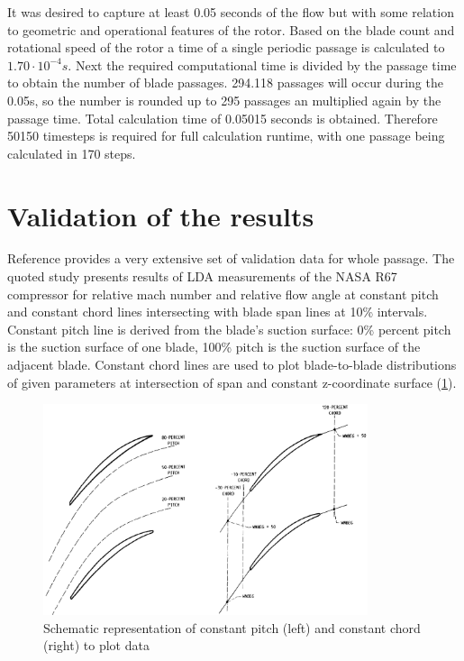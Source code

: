 It was desired to capture at least 0.05 seconds of the flow but with some relation to geometric and operational features of the rotor. Based on the blade count and rotational speed of the rotor a time of a single periodic passage is calculated to $1.70 \cdot 10^{-4}s$. Next the required computational time is divided by the passage time to obtain the number of blade passages. 294.118 passages will occur during the 0.05s, so the number is rounded up to 295 passages an multiplied again by the passage time. Total calculation time of 0.05015 seconds is obtained. Therefore 50150 timesteps is required for full calculation runtime, with one passage being calculated in 170 steps.

\section{Validation of the results}
Reference \citep{r67laser} provides a very extensive set of validation data for whole passage. The quoted study presents results of LDA measurements of the NASA R67 compressor for relative mach number and relative flow angle at constant pitch and constant chord lines intersecting with blade span lines at 10\% intervals. Constant pitch line is derived from the blade's suction surface: 0\% percent pitch is the suction surface of one blade, 100\% pitch is the suction surface of the adjacent blade. Constant chord lines are used to plot blade-to-blade distributions of given parameters at intersection of span and constant z-coordinate surface (\ref{fig_LA}).

\begin{figure}[h!]
\centering %
\includegraphics[width=0.85\textwidth]{Pictures/LA.png}
\caption{Schematic representation of constant pitch (left) and constant chord (right) to plot data \citep{r67laser}}
\label{fig_LA}
\end{figure}

